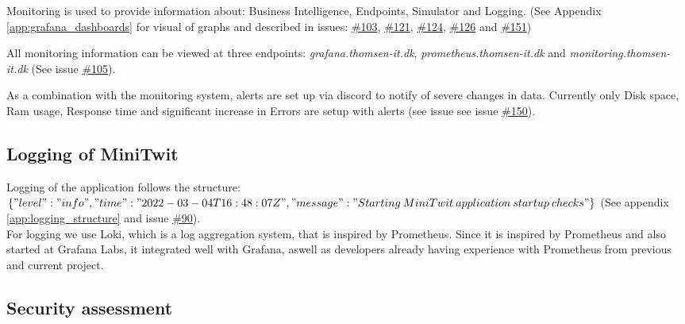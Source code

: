 Monitoring is used to provide information about: Business Intelligence, Endpoints, Simulator and Logging. (See Appendix \ref{app:grafana_dashboards} for visual of graphs and described in issues: \href{https://github.com/DevelOpsITU/MiniTwit/issues/103}{\#103},  \href{https://github.com/DevelOpsITU/MiniTwit/issues/121}{\#121},
\href{https://github.com/DevelOpsITU/MiniTwit/issues/124}{\#124},
\href{https://github.com/DevelOpsITU/MiniTwit/issues/126}{\#126} and 
\href{https://github.com/DevelOpsITU/MiniTwit/issues/151}{\#151})\\

All monitoring information can be viewed at three endpoints: \textit{grafana.thomsen-it.dk}, \textit{prometheus.thomsen-it.dk} and \textit{monitoring.thomsen-it.dk} (See issue \href{https://github.com/DevelOpsITU/MiniTwit/issues/105}{\#105}).

As a combination with the monitoring system, alerts are set up via discord to notify of severe changes in data. Currently only Disk space, Ram usage, Response time and significant increase in Errors are setup with alerts (see issue see issue \href{https://github.com/DevelOpsITU/MiniTwit/issues/150}{\#150}).


\subsection{Logging of MiniTwit}
Logging of the application follows the structure: \\
$\{"level":"info","time":"2022-03-04T16:48:07Z",\\"message":"Starting\: MiniTwit\: application\: startup\: checks"\}$ (See appendix \ref{app:logging_structure} and issue \href{https://github.com/DevelOpsITU/MiniTwit/issues/90}{\#90}).\\

For logging we use Loki, which is a log aggregation system, that is inspired by Prometheus\cite{grafana_loki}\cite{grafana_loki_docs}. Since it is inspired by Prometheus and also started at Grafana Labs, it integrated well with Grafana, aswell as developers already having experience with Prometheus from previous and current project. 

\subsection{Security assessment}



